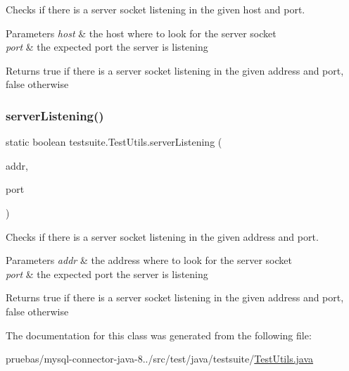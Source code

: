 Checks if there is a server socket listening in the given host and port.


\begin{DoxyParams}{Parameters}
{\em host} & the host where to look for the server socket \\
\hline
{\em port} & the expected port the server is listening \\
\hline
\end{DoxyParams}
\begin{DoxyReturn}{Returns}
true if there is a server socket listening in the given address and port, false otherwise 
\end{DoxyReturn}
\mbox{\label{classtestsuite_1_1_test_utils_a12975c2246ae1be20b9352ad1cff9460}} 
\subsubsection{\texorpdfstring{server\+Listening()}{serverListening()}\hspace{0.1cm}{\footnotesize\ttfamily [2/2]}}
{\footnotesize\ttfamily static boolean testsuite.\+Test\+Utils.\+server\+Listening (\begin{DoxyParamCaption}\item[{Inet\+Address}]{addr,  }\item[{int}]{port }\end{DoxyParamCaption})\hspace{0.3cm}{\ttfamily [static]}}

Checks if there is a server socket listening in the given address and port.


\begin{DoxyParams}{Parameters}
{\em addr} & the address where to look for the server socket \\
\hline
{\em port} & the expected port the server is listening \\
\hline
\end{DoxyParams}
\begin{DoxyReturn}{Returns}
true if there is a server socket listening in the given address and port, false otherwise 
\end{DoxyReturn}


The documentation for this class was generated from the following file\+:\begin{DoxyCompactItemize}
\item 
pruebas/mysql-\/connector-\/java-\/8../src/test/java/testsuite/\mbox{\hyperlink{test_2java_2testsuite_2_test_utils_8java}{Test\+Utils.\+java}}\end{DoxyCompactItemize}
